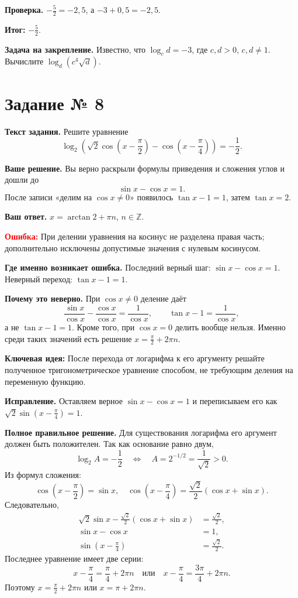 \documentclass[12pt,a4paper]{article}
\newcommand{\err}{\textcolor{red}{Ошибка:}}
\newcommand{\idea}{\textcolor{blue!60!black}{Ключевая идея:}}
\newcommand{\result}{\textcolor{teal!60!black}{Итог:}}
\begin{document}
\textbf{Проверка.} $-\frac52=-2{,}5$, а $-3+0{,}5=-2{,}5$.

\textbf{\result} $\boxed{-\frac52}$.

\textbf{Задача на закрепление.} Известно, что $\log_c d=-3$, где $c,d>0$, $c,d\ne1$. Вычислите $\log_d(c^4\sqrt d)$.

\newpage
{}\label{task:8}
\section*{Задание № 8}
\textbf{Текст задания.} Решите уравнение
\[\log_2\left(\sqrt2\cos\left(x-\frac\pi2\right)-\cos\left(x-\frac\pi4\right)\right)=-\frac12.\]

\textbf{Ваше решение.} Вы верно раскрыли формулы приведения и сложения углов и дошли до
\[\sin x-\cos x=1.\]
После записи «делим на $\cos x\ne0$» появилось $\tan x-1=1$, затем $\tan x=2$.

\textbf{Ваш ответ.} $x=\arctan2+\pi n$, $n\in\mathbb Z$.

\textbf{\err} При делении уравнения на косинус не разделена правая часть; дополнительно исключены допустимые значения с нулевым косинусом.

\textbf{Где именно возникает ошибка.} Последний верный шаг: $\sin x-\cos x=1$. Неверный переход: $\tan x-1=1$.

\textbf{Почему это неверно.} При $\cos x\ne0$ деление даёт
\[\frac{\sin x}{\cos x}-\frac{\cos x}{\cos x}=\frac1{\cos x},\qquad
\tan x-1=\frac1{\cos x},\]
а не $\tan x-1=1$. Кроме того, при $\cos x=0$ делить вообще нельзя. Именно среди таких значений есть решение $x=\frac\pi2+2\pi n$.

\textbf{\idea} После перехода от логарифма к его аргументу решайте полученное тригонометрическое уравнение способом, не требующим деления на переменную функцию.

\textbf{Исправление.} Оставляем верное $\sin x-\cos x=1$ и переписываем его как $\sqrt2\sin\left(x-\frac\pi4\right)=1$.

\textbf{Полное правильное решение.} Для существования логарифма его аргумент должен быть положителен. Так как основание равно двум,
\[\log_2 A=-\frac12\quad\Longleftrightarrow\quad A=2^{-1/2}=\frac1{\sqrt2}>0.\]
Из формул сложения:
\[\cos\left(x-\frac\pi2\right)=\sin x,\quad
\cos\left(x-\frac\pi4\right)=\frac{\sqrt2}{2}(\cos x+\sin x).\]
Следовательно,
\begin{align*}
\sqrt2\sin x-\frac{\sqrt2}{2}(\cos x+\sin x)&=\frac{\sqrt2}{2},\\
\sin x-\cos x&=1,\\
\sin\left(x-\frac\pi4\right)&=\frac{\sqrt2}{2}.
\end{align*}
Последнее уравнение имеет две серии:
\[x-\frac\pi4=\frac\pi4+2\pi n\quad\text{или}\quad
x-\frac\pi4=\frac{3\pi}{4}+2\pi n.\]
Поэтому $x=\frac\pi2+2\pi n$ или $x=\pi+2\pi n$.
\end{document}

